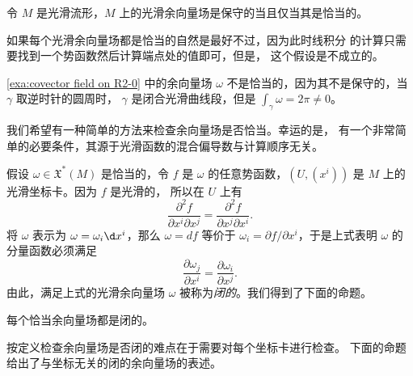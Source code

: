 \begin{theorem}
  令 $M$ 是光滑流形，$M$ 上的光滑余向量场是保守的当且仅当其是恰当的。
\end{theorem}

如果每个光滑余向量场都是恰当的自然是最好不过，因为此时线积分
的计算只需要找到一个势函数然后计算端点处的值即可，但是，
这个假设是不成立的。

\begin{example}
  \autoref{exa:covector field on R2-0} 中的余向量场 $\omega$
  不是恰当的，因为其不是保守的，当 $\gamma$ 取逆时针的圆周时，
  $\gamma$ 是闭合光滑曲线段，但是 $\int_\gamma\omega=2\pi\neq 0$。
\end{example}

我们希望有一种简单的方法来检查余向量场是否恰当。幸运的是，
有一个非常简单的必要条件，其源于光滑函数的混合偏导数与计算顺序无关。

假设 $\omega\in \mathfrak{X}^*(M)$ 是恰当的，令 $f$ 是 $\omega$
的任意势函数，$(U,(x^i))$ 是 $M$ 上的光滑坐标卡。因为 $f$ 是光滑的，
所以在 $U$ 上有
\[
  \frac{\partial^2 f}{\partial x^i\partial x^j}=
  \frac{\partial^2 f}{\partial x^j\partial x^i} .
\]
将 $\omega$ 表示为 $\omega=\omega_i \d x^i$，那么 $\omega= df$
等价于 $\omega_i=\partial f/\partial x^i$，于是上式表明
$\omega$ 的分量函数必须满足
\begin{equation}\label{eq:close covector field}
  \frac{\partial \omega_j}{\partial x^i}=\frac{\partial\omega_i}{\partial x^j}.  
\end{equation}
由此，满足上式的光滑余向量场 $\omega$ 被称为\emph{闭的}。我们得到了下面的命题。

\begin{proposition}
  每个恰当余向量场都是闭的。
\end{proposition}

按定义检查余向量场是否闭的难点在于需要对每个坐标卡进行检查。
下面的命题给出了与坐标无关的闭的余向量场的表述。

